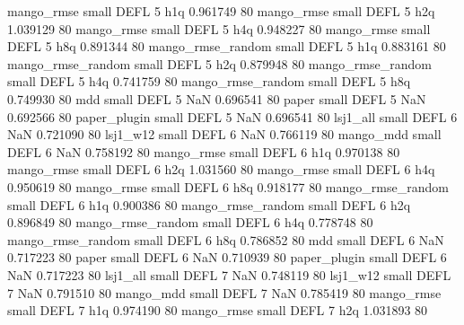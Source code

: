        mango_rmse      small     DEFL                 5                  h1q 0.961749 80
       mango_rmse      small     DEFL                 5                  h2q 1.039129 80
       mango_rmse      small     DEFL                 5                  h4q 0.948227 80
       mango_rmse      small     DEFL                 5                  h8q 0.891344 80
mango_rmse_random      small     DEFL                 5                  h1q 0.883161 80
mango_rmse_random      small     DEFL                 5                  h2q 0.879948 80
mango_rmse_random      small     DEFL                 5                  h4q 0.741759 80
mango_rmse_random      small     DEFL                 5                  h8q 0.749930 80
              mdd      small     DEFL                 5                  NaN 0.696541 80
            paper      small     DEFL                 5                  NaN 0.692566 80
     paper_plugin      small     DEFL                 5                  NaN 0.696541 80
         lsj1_all      small     DEFL                 6                  NaN 0.721090 80
         lsj1_w12      small     DEFL                 6                  NaN 0.766119 80
        mango_mdd      small     DEFL                 6                  NaN 0.758192 80
       mango_rmse      small     DEFL                 6                  h1q 0.970138 80
       mango_rmse      small     DEFL                 6                  h2q 1.031560 80
       mango_rmse      small     DEFL                 6                  h4q 0.950619 80
       mango_rmse      small     DEFL                 6                  h8q 0.918177 80
mango_rmse_random      small     DEFL                 6                  h1q 0.900386 80
mango_rmse_random      small     DEFL                 6                  h2q 0.896849 80
mango_rmse_random      small     DEFL                 6                  h4q 0.778748 80
mango_rmse_random      small     DEFL                 6                  h8q 0.786852 80
              mdd      small     DEFL                 6                  NaN 0.717223 80
            paper      small     DEFL                 6                  NaN 0.710939 80
     paper_plugin      small     DEFL                 6                  NaN 0.717223 80
         lsj1_all      small     DEFL                 7                  NaN 0.748119 80
         lsj1_w12      small     DEFL                 7                  NaN 0.791510 80
        mango_mdd      small     DEFL                 7                  NaN 0.785419 80
       mango_rmse      small     DEFL                 7                  h1q 0.974190 80
       mango_rmse      small     DEFL                 7                  h2q 1.031893 80
